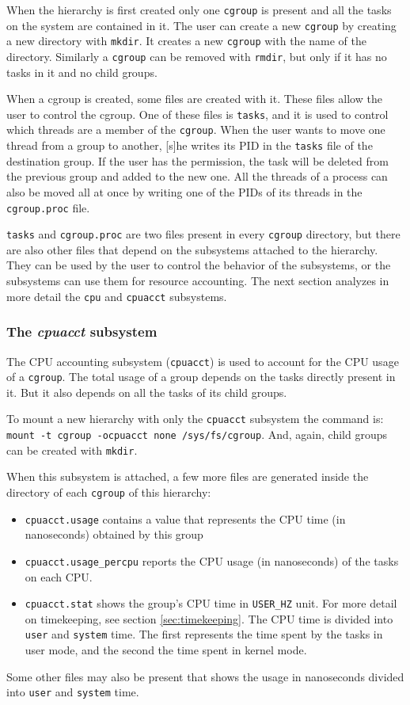 When the hierarchy is first created only one \verb|cgroup| is present and all the tasks on the system are contained in it. The user can create a new \verb|cgroup| by creating a new directory with \verb|mkdir|. It creates a new \verb|cgroup| with the name of the directory. Similarly a \verb|cgroup| can be removed with \verb|rmdir|, but only if it has no tasks in it and no child groups. 

When a cgroup is created, some files are created with it. These files allow the user to control the cgroup. One of these files is \verb|tasks|, and it is used to control which threads are a member of the \verb|cgroup|. When the user wants to move one thread from a group to another, [s]he writes its PID in the \verb|tasks| file of the destination group. If the user has the permission, the task will be deleted from the previous group and added to the new one. All the threads of a process can also be moved all at once by writing one of the PIDs of its threads in the \verb|cgroup.proc| file. 

\verb|tasks| and \verb|cgroup.proc| are two files present in every \verb|cgroup| directory, but there are also other files that depend on the subsystems attached to the hierarchy. They can be used by the user to control the behavior of the subsystems, or the subsystems can use them for resource accounting.  The next section analyzes in more detail the \verb|cpu| and \verb|cpuacct| subsystems.

\subsubsection{The \textit{cpuacct} subsystem}

The CPU accounting subsystem (\verb|cpuacct|) is used to account for the CPU usage of a \verb|cgroup|. The total usage of a group depends on the tasks directly present in it. But it also depends on all the tasks of its child groups.

To mount a new hierarchy with only the \verb|cpuacct| subsystem the command is: \verb|mount -t cgroup -ocpuacct none /sys/fs/cgroup|. And, again, child groups can be created with \verb|mkdir|.

When this subsystem is attached, a few more files are generated inside the directory of each \verb|cgroup| of this hierarchy:
\begin{itemize}
    \item \verb|cpuacct.usage| contains a value that represents the CPU time (in nanoseconds) obtained  by this group
    \item \verb|cpuacct.usage_percpu| reports the CPU usage (in nanoseconds) of the tasks on each CPU.
    \item \verb|cpuacct.stat| shows the group's CPU time in \verb|USER_HZ| unit. For more detail on timekeeping, see section \ref{sec:timekeeping}. The CPU time is divided into \verb|user| and \verb|system| time. The first represents the time spent by the tasks in user mode, and the second the time spent in kernel mode.
\end{itemize}
Some other files may also be present that shows the usage in nanoseconds divided into \verb|user| and \verb|system| time.

